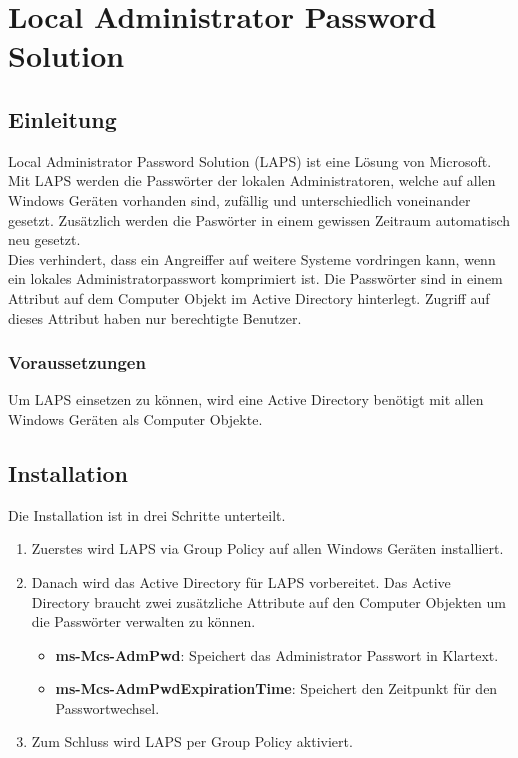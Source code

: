 \chapter{Local Administrator Password Solution}
\section{Einleitung}
Local Administrator Password Solution (LAPS) ist eine Lösung von Microsoft.
Mit LAPS werden die Passwörter der lokalen Administratoren, welche auf allen Windows Geräten vorhanden sind, zufällig und unterschiedlich voneinander gesetzt.
Zusätzlich werden die Paswörter in einem gewissen Zeitraum automatisch neu gesetzt.\\

Dies verhindert, dass ein Angreiffer auf weitere Systeme vordringen kann, wenn ein lokales Administratorpasswort komprimiert ist.
Die Passwörter sind in einem Attribut auf dem Computer Objekt im Active Directory hinterlegt.
Zugriff auf dieses Attribut haben nur berechtigte Benutzer.

\subsection{Voraussetzungen}
Um LAPS einsetzen zu können, wird eine Active Directory benötigt mit allen Windows Geräten als Computer Objekte.

\section{Installation}
Die Installation ist in drei Schritte unterteilt.
\begin{enumerate}
    \item Zuerstes wird LAPS via Group Policy auf allen Windows Geräten installiert.
    \item Danach wird das Active Directory für LAPS vorbereitet. Das Active Directory braucht zwei zusätzliche Attribute auf den Computer Objekten um die Passwörter verwalten zu können.
          \begin{itemize}
              \item \textbf{ms-Mcs-AdmPwd}: Speichert das Administrator Passwort in Klartext.
              \item \textbf{ms-Mcs-AdmPwdExpirationTime}: Speichert den Zeitpunkt für den Passwortwechsel.
          \end{itemize}
    \item Zum Schluss wird LAPS per Group Policy aktiviert.
\end{enumerate}

